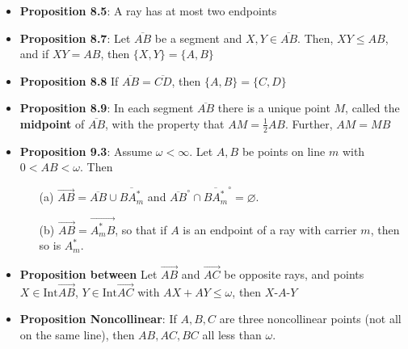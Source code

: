 \documentclass{report}
\begin{document}
\begin{itemize}
        \item \textbf{Proposition 8.5}: A ray has at most two endpoints
        \item \textbf{Proposition 8.7}: Let $\overline{AB}$ be a segment and $X,Y \in \overline{AB}$. Then, $XY \leq AB$, and if $XY = AB$, then $\{X,Y\} = \{A,B\}$
        \item \textbf{Proposition 8.8} If $\overline{AB} = \overline{CD}$, then $\{A,B\}  = \{C,D\}$
        \item \textbf{Proposition 8.9}: In each segment $\overline{AB}$ there is a unique point $M$, called the \textbf{midpoint} of $\overline{AB} $, with the property that $AM = \frac{1}{2}AB$. Further, $AM = MB $
        \item \textbf{Proposition 9.3}: Assume \( \omega < \infty \). Let \( A, B \) be points on line \( m \)  
            with \( 0 < AB < \omega \). Then  
            \begin{enumerate}
                \item[(a)] \( \overrightarrow{AB} = \overline{AB} \cup \overline{BA_m^*} \) and \( \overline{AB}^{\circ} \cap \overline{BA_m^*}^{\circ} = \varnothing \).
                \item[(b)] \( \overrightarrow{AB} = \overrightarrow{A_m^* B} \), so that if \( A \) is an endpoint of a ray  
                    with carrier \( m \), then so is \( A_m^* \).
            \end{enumerate}
        \item \textbf{Proposition between} Let $\overrightarrow{AB}$ and $\overrightarrow{AC}$ be opposite rays, and points $X \in \text{Int}\overrightarrow{AB}$, $Y \in \text{Int}\overrightarrow{AC} $ with $AX + AY \leq \omega$, then $ X\text{-}A\text{-}Y$
        \item \textbf{Proposition Noncollinear}: If $A,B,C$ are three noncollinear points (not all on the same line), then $AB, AC,BC$ all less than $\omega$.

    \end{itemize}







    
\end{document}
